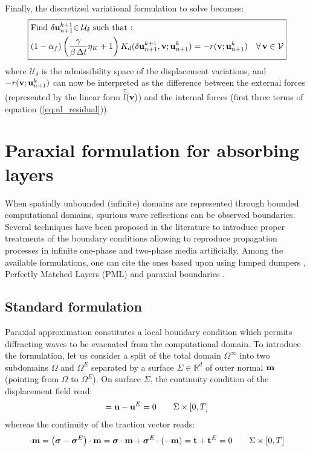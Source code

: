 \documentclass{report}
\newcommand{\bu}{\textbf{u}}
\newcommand{\bv}{\textbf{v}}
\newcommand{\bt}{\boldsymbol t}
\def\bsigma{\mbox{\boldmath${\sigma}$}}
\def\bm{{\bf m}}
\def\bt{{\bf t}}
\def\bu{{\bf{u}}}
\def\bv{{\bf{v}}}
\begin{document}
Finally, the discretized variational formulation to solve becomes:
\begin{equation}
\boxed{\begin{aligned} & \text{Find \ensuremath{\delta{\bu_{n+1}^{k+1}}}\ensuremath{\in\mathcal{U}_{\delta}} such that : }\\
 & (1-\alpha_{f})\left(\frac{\gamma}{\beta\,\Delta t}\eta_{K}+1\right)K_{d}(\delta{\bu_{n+1}^{k+1}},\bv;\bu_{n+1}^{k})=-r(\bv;\bu_{n+1}^{k})\quad\text{\ensuremath{\forall\,}}\bv\in\mathcal{V}
\end{aligned}
}
\end{equation}
where $\mathcal{U}_{\delta}$ is the admissibility space of the displacement
variations, and $-r(\bv;\bu_{n+1}^{k})$ can now be interpreted as
the difference between the external forces (represented by the linear form $\widetilde{\widetilde{l}}(\bv)$)
and the internal forces (first three terms of equation (\ref{eq:nl_residual})).

\section{Paraxial formulation for absorbing layers}

When spatially unbounded (infinite) domains are represented through bounded computational domains, spurious wave reflections can be observed boundaries.
Several techniques have been proposed in the literature to introduce proper treatments of the boundary conditions allowing to reproduce propagation processes in infinite one-phase and two-phase media artificially. Among the available formulations, one can cite the ones based upon using lumped dumpers \cite{lysmer1969finite}, Perfectly Matched Layers
(PML) \cite{berenger1994perfectly} and paraxial boundaries \cite{engquist1977absorbing,clayton1977absorbing,aubry1985local,MODARESSI1994117}.

\subsection{Standard formulation}

Paraxial approximation constitutes a local boundary condition which permits diffracting waves to be evacuated from the computational domain. To introduce the formulation, let us consider a split of the total domain $\Omega^{\infty}$ into two subdomains $\Omega$ and $\Omega^{E}$ separated by a surface $\Sigma\in\mathbb{R}^{d}$ of outer normal $\bm{}$ (pointing from $\Omega$ to $\Omega^{E}$). On surface $\Sigma$, the continuity condition of the displacement field read:
\begin{equation}
[|\bu|]=\bu-\bu^{E}=0\qquad\Sigma\times[0,T]
\end{equation}
%
whereas the continuity of the traction vector reads:
%
\begin{equation}
[|\bsigma|]\cdot\bm{}=\left(\bsigma-\bsigma^{E}\right)\cdot\bm{}=\bsigma\cdot\bm{}+\bsigma^{E}\cdot(-\bm{})=\bt+\bt^{E}=0\qquad\Sigma\times[0,T]\label{eq:paraxial_continuity_t}
\end{equation}
\end{document}
